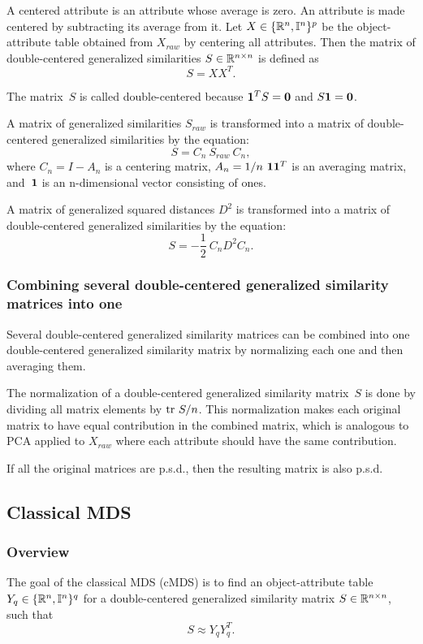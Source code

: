 \documentclass[10pt,a4paper]{article}
\begin{document}
A centered attribute is an attribute whose average is zero.
An attribute is made centered by subtracting its average from it.
Let $X \in \{\mathbb R^n,\mathbb I^n\}^p$ be the object-attribute table obtained from $X_{raw}$ by centering all attributes.
Then the matrix of double-centered generalized similarities $S \in \mathbb R^{n \times n}$ is defined as
$$ S = X X^T. $$

The matrix~$S$ is called double-centered because $\mathbf 1^TS = \mathbf 0$ and $S \mathbf 1 = \mathbf 0$.

A matrix of generalized similarities $S_{raw}$ is transformed into a matrix of double-centered generalized similarities by the equation:
$$ S = C_n \ S_{raw} \ C_n, $$
where $C_n = I - A_n$ is a centering matrix,
$A_n = 1/n \ \mathbf 1 \mathbf 1^T$ is an averaging matrix,
and~$\mathbf 1$ is an n-dimensional vector consisting of ones.

A matrix of generalized squared distances $D^2$ is transformed into a matrix of double-centered generalized similarities by the equation:
$$ S = - \frac 1 2 \ C_n D^2 C_n. $$


\subsubsection {Combining several double-centered generalized similarity matrices into one}

Several double-centered generalized similarity matrices can be combined into one double-centered generalized similarity matrix by normalizing each one and then averaging them.

The normalization of a double-centered generalized similarity matrix~$S$ is done by dividing all matrix elements by $\mathrm {tr} \  S/n$.
This normalization makes each original matrix to have equal contribution in the combined matrix,
which is analogous to PCA applied to $X_{raw}$ where each attribute should have the same contribution.

If all the original matrices are p.s.d., then the resulting matrix is also p.s.d.


\subsection {Classical MDS}

\subsubsection{Overview}

The goal of the classical MDS (cMDS) is to find an object-attribute table $Y_q \in \{\mathbb R^n,\mathbb I^n\}^q$ for a double-centered generalized similarity matrix $S \in \mathbb R^{n \times n}$,
such that
$$ S \approx Y_q Y_q^T. $$
\end{document}
